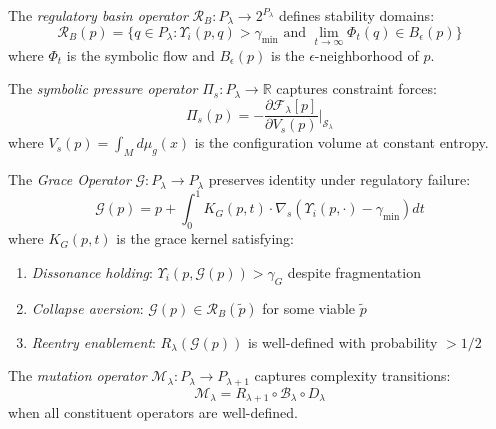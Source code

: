 \begin{definition}
\label{definition:bk6_regulatory_basin_operator}
The \emph{regulatory basin operator} $\mathcal{R}_B : P_\lambda \to 2^{P_\lambda}$ defines stability domains:
\begin{equation}
\mathcal{R}_B(p) = \{q \in P_\lambda : \Upsilon_i(p,q) > \gamma_{\min} \text{ and } \lim_{t \to \infty} \Phi_t(q) \in B_\epsilon(p)\}
\end{equation}
where $\Phi_t$ is the symbolic flow and $B_\epsilon(p)$ is the $\epsilon$-neighborhood of $p$.
\end{definition}

\begin{definition}
\label{definition:bk6_symbolic_pressure_operator}
The \emph{symbolic pressure operator} $\Pi_s : P_\lambda \to \mathbb{R}$ captures constraint forces:
\begin{equation}
\Pi_s(p) = -\frac{\partial \mathcal{F}_\lambda[p]}{\partial V_s(p)}\bigg|_{\mathcal{S}_\lambda}
\end{equation}
where $V_s(p) = \int_M d\mu_g(x)$ is the configuration volume at constant entropy.
\end{definition}

\begin{definition}
\label{definition:bk6_grace_operator_complete}
The \emph{Grace Operator} $\mathcal{G} : P_{\lambda} \to P_{\lambda}$ preserves identity under regulatory failure:
\begin{equation}
\mathcal{G}(p) = p + \int_0^1 K_G(p,t) \cdot \nabla_s \left( \Upsilon_i(p, \cdot) - \gamma_{\min} \right) dt
\end{equation}
where $K_G(p,t)$ is the grace kernel satisfying:
\begin{enumerate}
\item \emph{Dissonance holding}: $\Upsilon_i(p, \mathcal{G}(p)) > \gamma_G$ despite fragmentation
\item \emph{Collapse aversion}: $\mathcal{G}(p) \in \mathcal{R}_B(\tilde{p})$ for some viable $\tilde{p}$
\item \emph{Reentry enablement}: $R_\lambda(\mathcal{G}(p))$ is well-defined with probability $> 1/2$
\end{enumerate}
\end{definition}

\begin{definition}
\label{definition:bk6_mutation_operator_complete}
The \emph{mutation operator} $\mathcal{M}_{\lambda} : P_{\lambda} \to P_{\lambda+1}$ captures complexity transitions:
\begin{equation}
\mathcal{M}_{\lambda} = R_{\lambda+1} \circ \mathcal{B}_{\lambda} \circ D_{\lambda}
\end{equation}
when all constituent operators are well-defined.
\end{definition}

